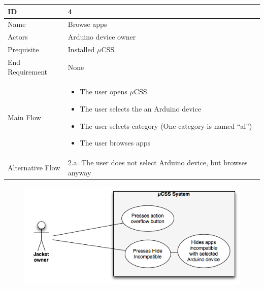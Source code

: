         \begin{table}
        \begin{tabular}{|l|l|}
            \hline
            ID               & 4 \\ \hline
            Name             & Browse apps \\
            Actors           & Arduino device owner \\
            Prequisite       & Installed $\mu$CSS \\
            End Requirement  & None \\
            Main Flow        &      
                    \begin{itemize}
                    \item{The user opens $\mu$CSS}
                    \item{The user selects the an Arduino device}
                    \item{The user selects category (One category is named ``al'')}
                    \item{The user browses apps}
                    \end{itemize} \\
            Alternative Flow & 2.a. The user does not select Arduino device, but browses anyway
           \\ \hline
        \end{tabular}
    \end{table}



\begin{figure}[H]
\centering
\includegraphics[scale=1]{images/UseCase5}
\end{figure}

